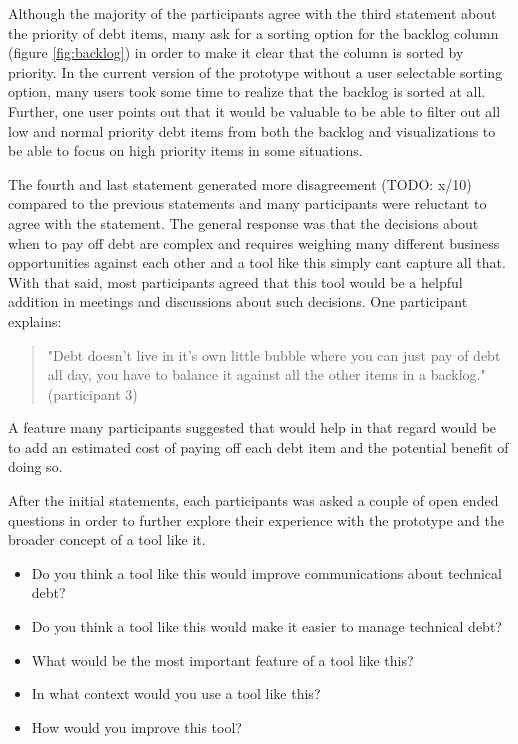 Although the majority of the participants agree with the third statement about the priority of debt items, many ask for a sorting option for the backlog column (figure \ref{fig:backlog}) in order to make it clear that the column is sorted by priority.
In the current version of the prototype without a user selectable sorting option, many users took some time to realize that the backlog is sorted at all.
Further, one user points out that it would be valuable to be able to filter out all low and normal priority debt items from both the backlog and visualizations to be able to focus on high priority items in some situations.

The fourth and last statement generated more disagreement (TODO: x/10) compared to the previous statements and many participants were reluctant to agree with the statement.
The general response was that the decisions about when to pay off debt are complex and requires weighing many different business opportunities against each other and a tool like this simply cant capture all that.
With that said, most participants agreed that this tool would be a helpful addition in meetings and discussions about such decisions.
One participant explains:
\begin{quote}
  "Debt doesn't live in it's own little bubble where you can just pay of debt all day, you have to balance it against all the other items in a backlog." (participant 3)
\end{quote}
A feature many participants suggested that would help in that regard would be to add an estimated cost of paying off each debt item and the potential benefit of doing so.

After the initial statements, each participants was asked a couple of open ended questions in order to further explore their experience with the prototype and the broader concept of a tool like it.

\smallskip
\begin{itemize}
  \item Do you think a tool like this would improve communications about technical debt?
  \item Do you think a tool like this would make it easier to manage technical debt?
  \item What would be the most important feature of a tool like this?
  \item In what context would you use a tool like this?
  \item How would you improve this tool?
\end{itemize}
\smallskip

